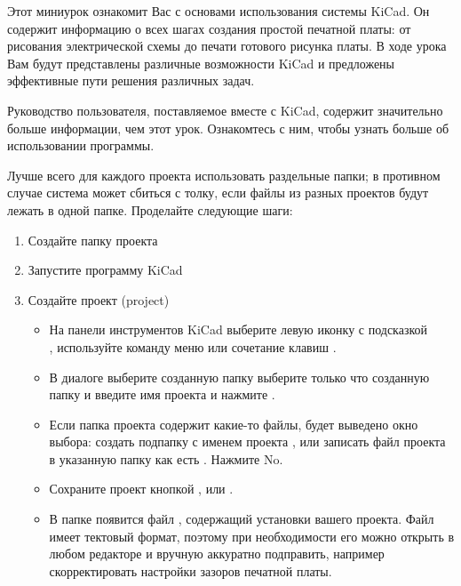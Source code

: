 

Этот миниурок ознакомит Вас с основами использования системы KiCad. Он содержит
информацию о всех шагах создания простой печатной платы: от рисования
электрической схемы до печати готового рисунка платы. В ходе урока Вам будут
представлены различные возможности KiCad и предложены эффективные пути решения
различных задач.

Руководство пользователя, поставляемое вместе с KiCad, содержит значительно
больше информации, чем этот урок. Ознакомтесь с ним, чтобы узнать больше об
использовании программы.



\secdown


Лучше всего для каждого проекта использовать раздельные папки; в противном
случае система может сбиться с толку, если файлы из разных проектов будут лежать
в одной папке. Проделайте следующие шаги:

\begin{enumerate}
  \item Создайте папку проекта 
  \item Запустите программу KiCad
  \item Создайте проект (project)
  \begin{itemize}
    \item 
На панели инструментов KiCad выберите левую иконку с подсказкой\\
, используйте команду меню
 или сочетание клавиш .
    \item 
В диалоге  выберите созданную папку
выберите только что созданную папку  и
введите имя проекта  и нажмите .
	\item
Если папка проекта содержит какие-то файлы, будет выведено окно выбора:
создать подпапку с именем проекта , или записать файл проекта
в указанную папку как есть . Нажмите No.
    \item 
Сохраните проект кнопкой , 
или .
	\item
В папке появится файл , содержащий установки вашего 
проекта. Файл имеет тектовый формат, поэтому при необходимости его можно открыть
в любом редакторе и вручную аккуратно подправить, например скорректировать
настройки зазоров печатной платы.
  \end{itemize}
\end{enumerate}

